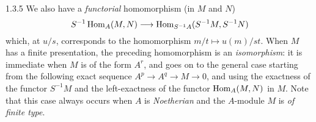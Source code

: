\documentclass[../main.tex]{subfiles}
\begin{document}
\begin{env}{1.3.5}
We also have a \emph{functorial} homomorphism (in $M$ and $N$)
\[
  S^{-1}\operatorname{Hom}_A(M,N)\longrightarrow\operatorname{Hom}_{S^{-1}A}(S^{-1}M,S^{-1}N)
\]
which, at $u/s$, corresponds to the homomorphism $m/t\mapsto u(m)/st$. When $M$ has a finite presentation, the
preceding homomorphism is an \emph{isomorphism}: it is immediate when $M$ is of the form $A^r$, and goes on to the general
case starting from the following exact sequence $A^p\to A^q\to M\to 0$, and using the exactness of the functor $S^{-1}M$ and
the left-exactness of the functor $\operatorname{Hom}_A(M,N)$ in $M$. Note that this case always occurs when $A$ is \emph{Noetherian} and the
$A$-module $M$ is \emph{of finite type}.
\end{env}
\end{document}
